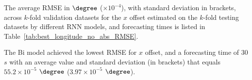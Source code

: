 The average RMSE in $\degree$ ($\times 10^{-4}$), with standard deviation in brackets, across $k$-fold validation datasets for the $x$ offset estimated on the $k$-fold testing datasets by different RNN models, and forecasting times is listed in Table~\ref{tab:best_longitude_no_abs_RMSE}.

\begin{table}[!ht]
	\centering
	\caption{The average RMSE in $\degree$ ($\times 10^{-4}$), with standard deviation in brackets, across $k$-fold validation datasets for the $x$ offset estimated on the $k$-fold testing datasets by different RNN models, and forecasting times.}
	\label{tab:best_longitude_no_abs_RMSE}
\end{table}

The Bi model achieved the lowest RMSE for $x$ offset, and a forecasting time of $30$ $s$ with an average value and standard deviation (in brackets) that equals $55.2 \times 10^{-5}$ $\degree$ ($3.97 \times 10^{-5}$ $\degree$).


